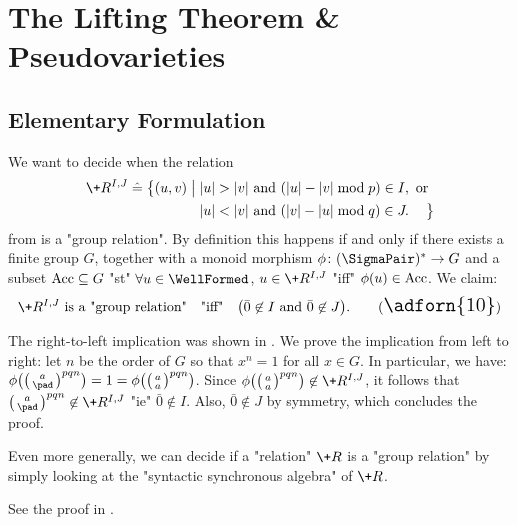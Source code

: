 \section{The Lifting Theorem \& Pseudovarieties}
\label{sec:lifting-theorem}

\subsection{Elementary Formulation}

\begin{example}
	\AP\label{ex:charac-group-relation-monoids}
	We want to decide when the relation
	\begin{align*}
		\+R^{I,J} \defeq \big\{
			(u,v) \;\big\vert\; & |u| > |v| \text{ and } (|u| - |v| \bmod{p}) \in I, \text{ or} \\
			& |u| < |v| \text{ and } (|v| - |u| \bmod{q}) \in J.
		\hphantom{\text{ or}}\big\}	
	\end{align*}
	from  is a \AP"group relation".
	By definition this happens if and only if there exists a finite group $G$,
	together with a monoid morphism $\phi\colon (\SigmaPair)^* \to G$ and a subset
	$\textrm{Acc} \subseteq G$ "st" $\forall u \in \WellFormed$, $u\in \+R^{I,J}$ "iff" $\phi(u) \in \textrm{Acc}$.
	We claim:
	\begin{equation}
		\+R^{I,J} \text{ is a "group relation"}\quad\text{"iff"}\quad
		\big(
			\bar 0 \not\in I \text{ and } \bar 0 \not\in J
		\big).
		\tag{{\Large\adforn{10}}}
	\end{equation}

	The right-to-left implication was shown in .
	We prove the implication from left to right:
	let $n$ be the order of $G$ so that $x^n = 1$ for all $x\in G$. In particular, we have:
	$\phi\bigl(\pair{a}{\pad}^{pqn}\bigr) = 1 = \phi\bigl(\pair{a}{a}^{pqn}\bigr)$.
	Since $\phi\bigl(\pair{a}{a}^{pqn}\bigr) \not\in \+R^{I,J}$, it follows that 
	$\pair{a}{\pad}^{pqn} \not\in \+R^{I,J}$
	"ie" $\bar 0 \not\in I$. Also, $\bar 0 \not\in J$ by symmetry, which concludes the proof.
\end{example}

\AP{}
Even more generally, we can decide if a "relation" $\+R$ is a "group relation"
by simply looking at the "syntactic synchronous algebra" of $\+R$.

\liftingtheoremmonoids

See the proof in .

